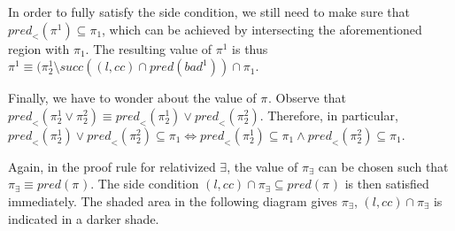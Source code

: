 \documentclass{article}
\newcommand{\placeholder}[1][]{\pi_{#1}}
\newcommand{\loc}{l}
\newcommand{\region}{\mathit{cc}}
\newcommand{\suc}{\mathit{succ}}
\newcommand{\pre}{\mathit{pred}}
\begin{document}
In order to fully satisfy the side condition, we still need to make sure that
$\pre_<(\placeholder^1) \subseteq \placeholder[1]$, which can be achieved by
intersecting the aforementioned region with $\placeholder[1]$. The resulting value
of $\placeholder^1$ is thus $\placeholder^1 \equiv (\placeholder[2]^1 \setminus \suc((\loc, \region) \cap \pre(\mathit{bad}^1)) \cap \placeholder[1]$. 

Finally, we have to wonder about the value of $\placeholder$. Observe that
$\pre_{<}(\placeholder[2]^1 \lor \placeholder[2]^2) \equiv \pre_{<}(\placeholder[2]^1) \lor \pre_{<}(\placeholder[2]^2)$. Therefore, in particular, $\pre_{<}(\placeholder[2]^1) \lor \pre_{<}(\placeholder[2]^2) \subseteq \placeholder[1] \iff \pre_{<}(\placeholder[2]^1) \subseteq \placeholder[1] \land \pre_{<}(\placeholder[2]^2) \subseteq \placeholder[1]$.

Again, in the proof rule for relativized $\exists$, the value of $\placeholder[\exists]$
can be chosen such that $\placeholder[\exists] \equiv \pre(\placeholder)$. The
side condition $(\loc, \region) \cap \placeholder[\exists] \subseteq \pre(\placeholder)$
is then satisfied immediately. The shaded area in the following diagram gives
$\placeholder[\exists]$, $(\loc, \region) \cap \placeholder[\exists]$ is indicated
in a darker shade.
\end{document}
